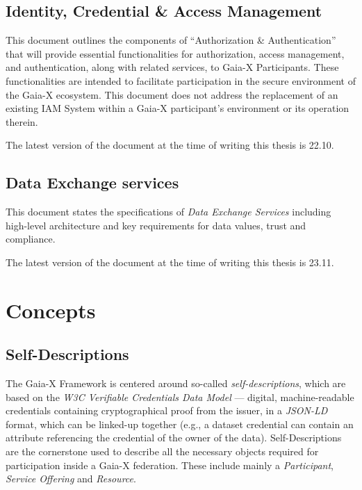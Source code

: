 \subsection{Identity, Credential \& Access Management}\label{subsec:identity-credential-&-access-management}

This document outlines the components of ``Authorization \& Authentication'' that will provide essential functionalities for authorization, access management, and authentication, along with related services, to Gaia-X Participants\cite{gaiax_identity_and_access_management}.
These functionalities are intended to facilitate participation in the secure environment of the Gaia-X ecosystem.
This document does not address the replacement of an existing IAM System within a Gaia-X participant's environment or its operation therein.

The latest version of the document at the time of writing this thesis is 22.10.

\subsection{Data Exchange services}\label{subsec:data-exchange-services}

This document states the specifications of \textit{Data Exchange Services} including high-level architecture and key requirements for data values, trust and compliance\cite{gaiax_data_exchange_document}.

The latest version of the document at the time of writing this thesis is 23.11.

\section{Concepts}\label{sec:concepts}

\subsection{Self-Descriptions}\label{subsec:self-descriptions}
The Gaia-X Framework is centered around so-called \textit{self-descriptions}, which are based on the \textit{W3C Verifiable Credentials Data Model} --- digital, machine-readable credentials containing cryptographical proof from the issuer, in a \textit{JSON-LD} format, which can be linked-up together (e.g., a dataset credential can contain an attribute referencing the credential of the owner of the data).
Self-Descriptions are the cornerstone used to describe all the necessary objects required for participation inside a Gaia-X federation.
These include mainly a \textit{Participant}, \textit{Service Offering} and \textit{Resource}.

